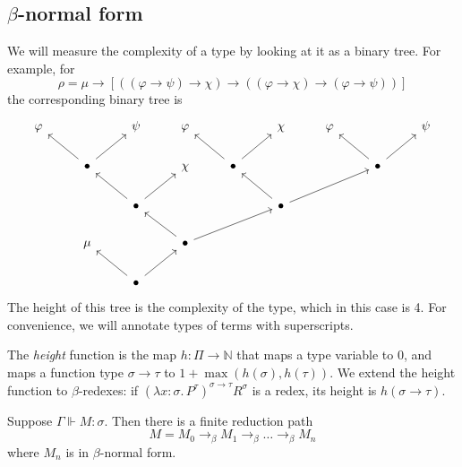\subsection{\texorpdfstring{\( \beta \)}{β}-normal form}
We will measure the complexity of a type by looking at it as a binary tree.
For example, for
\[ \rho = \mu \to [((\varphi \to \psi) \to \chi) \to ((\varphi \to \chi) \to (\varphi \to \psi))] \]
the corresponding binary tree is
\[\begin{tikzcd}
	\varphi && \psi & \varphi && \chi & \varphi && \psi \\
	& \bullet && \chi & \bullet &&& \bullet \\
	&& \bullet &&& \bullet \\
	& \mu && \bullet \\
	&& \bullet
	\arrow[from=5-3, to=4-2]
	\arrow[from=5-3, to=4-4]
	\arrow[from=4-4, to=3-3]
	\arrow[from=3-3, to=2-2]
	\arrow[from=3-3, to=2-4]
	\arrow[from=2-2, to=1-1]
	\arrow[from=2-2, to=1-3]
	\arrow[from=4-4, to=3-6]
	\arrow[from=3-6, to=2-5]
	\arrow[from=2-5, to=1-4]
	\arrow[from=2-5, to=1-6]
	\arrow[from=3-6, to=2-8]
	\arrow[from=2-8, to=1-7]
	\arrow[from=2-8, to=1-9]
\end{tikzcd}\]
The height of this tree is the complexity of the type, which in this case is 4.
For convenience, we will annotate types of terms with superscripts.
\begin{definition}
    The \emph{height} function is the map \( h : \Pi \to \mathbb N \) that maps a type variable to 0, and maps a function type \( \sigma \to \tau \) to \( 1 + \max(h(\sigma), h(\tau)) \).
    We extend the height function to \( \beta \)-redexes: if \( (\lambda x:\sigma.\, P^\tau)^{\sigma \to \tau} R^\sigma \) is a redex, its height is \( h(\sigma \to \tau) \).
\end{definition}
\begin{theorem}
    Suppose \( \Gamma \Vdash M : \sigma \).
    Then there is a finite reduction path
    \[ M = M_0 \to_\beta M_1 \to_\beta \dots \to_\beta M_n \]
    where \( M_n \) is in \( \beta \)-normal form.
\end{theorem}
